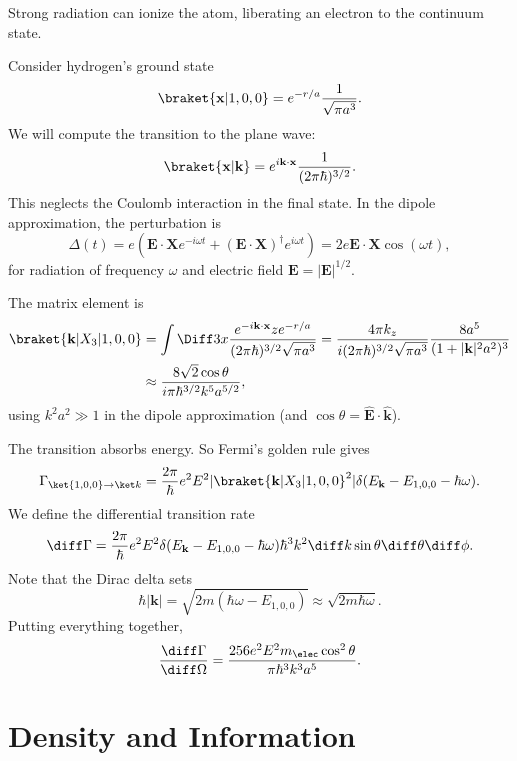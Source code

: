\documentclass[12pt]{article}
\begin{document}
\begin{exbox}[Ionization]
	Strong radiation can ionize the atom, liberating an electron to the continuum state.

	Consider hydrogen's ground state 
	\[
		\braket{\mathbf{x}|1,0,0} = e^{-r/a} \frac{1}{\sqrt{\pi a^3}}.
	\]
	We will compute the transition to the plane wave:
	\[
		\braket{\mathbf{x}|\mathbf{k}} = e^{i \mathbf{k} \cdot \mathbf{x}} \frac{1}{(2 \pi \hbar)^{3/2}}.
	\]
	This neglects the Coulomb interaction in the final state. In the dipole approximation, the perturbation is
	\[
	\Delta(t) = e(\mathbf{E} \cdot \mathbf{X} e^{-i \omega t} + (\mathbf{E} \cdot \mathbf{X})^{\dagger} e^{i \omega t}) = 2e \mathbf{E} \cdot \mathbf{X} \cos (\omega t),
	\]
	for radiation of frequency $\omega$ and electric field $\mathbf{E} = |\mathbf{E}|^{1/2}$.

	The matrix element is
	\begin{align*}
		\braket{\mathbf{k} | X_3 | 1, 0, 0} &= \int \Diff3 x \frac{e^{-i \mathbf{k} \cdot \mathbf{x}} z e^{-r/a}}{(2 \pi \hbar)^{3/2}\sqrt{\pi a^3}} = \frac{4 \pi k_z}{i (2 \pi \hbar)^{3/2} \sqrt{\pi a^3}} \frac{8a^{5}}{(1 + |\mathbf{k}|^2 a^2)^3} \\
						    &\approx \frac{8 \sqrt 2 \cos \theta}{i \pi \hbar^{3/2} k^{5} a^{5/2}},
	\end{align*}
	using $k^2a^2 \gg 1$ in the dipole approximation (and $\cos \theta = \mathbf{\hat E} \cdot \mathbf{\hat k}$).

	The transition absorbs energy. So Fermi's golden rule gives
	\[
		\Gamma_{\ket{1,0,0} \to \ket k} = \frac{2\pi}{\hbar} e^2 E^2 |\braket{\mathbf{k}|X_3|1,0,0}^2| \delta(E_{\mathbf{k}} - E_{1, 0, 0} - \hbar \omega).
	\]
	We define the differential transition rate
	\[
	\diff \Gamma = \frac{2 \pi}{\hbar} e^2 E^2 \delta(E_{\mathbf{k}} - E_{1, 0, 0} - \hbar \omega) \hbar^3 k^2 \diff k \sin \theta \diff \theta \diff \phi.
	\]
	Note that the Dirac delta sets
	\[
		\hbar |\mathbf{k}| = \sqrt{2m(\hbar \omega - E_{1, 0, 0})} \approx \sqrt{2m \hbar \omega}.
	\]
	Putting everything together,
	\[
	\frac{\diff \Gamma}{\diff \Omega} = \frac{256 e^2 E^2 m_\elec \cos^2\theta}{\pi \hbar^3 k^3 a^{5}}.
	\]
\end{exbox}

\newpage

\section{Density and Information}
\label{sec:dense_info}
\end{document}
